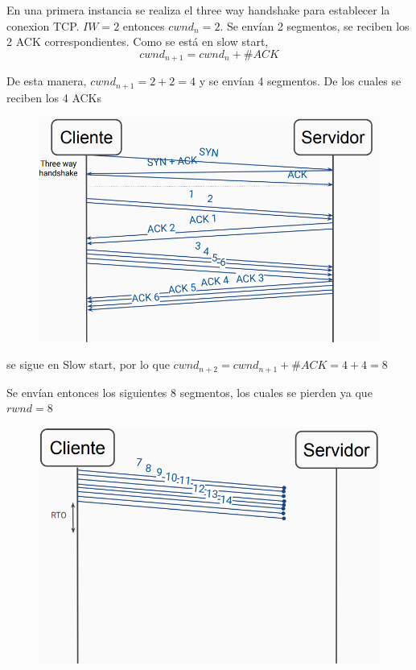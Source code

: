 \documentclass[titlepage,a4paper]{article}
\begin{document}
En una primera instancia se realiza el three way handshake para establecer la conexion TCP. $IW = 2$ entonces $cwnd_n = 2$. Se envían 2 segmentos, se reciben los 2 ACK correspondientes. Como se está en slow start, $$cwnd_{n+1} = cwnd_n + \#ACK $$

De esta manera, $cwnd_{n+1} = 2 + 2 = 4 $ y se envían 4 segmentos. De los cuales se reciben los 4 ACKs


\begin{figure}[H]
\centering
\includegraphics[width=\textwidth]{resolucion2.png}
\end{figure}

se sigue en Slow start, por lo que  $cwnd_{n+2} = cwnd_{n+1} + \#ACK = 4 + 4 = 8 $

Se envían entonces los siguientes 8 segmentos, los cuales se pierden ya que $ rwnd = 8 $

\begin{figure}[H]
\centering
\includegraphics[width=\textwidth]{resolucion3.png}
\end{figure}
\end{document}
